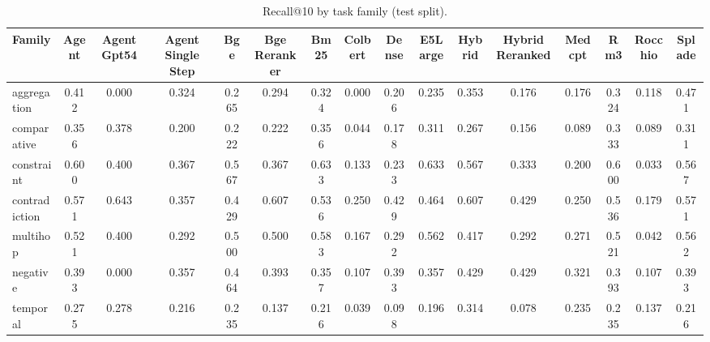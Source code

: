 \begin{table}[t]
\centering
\caption{Recall@10 by task family (test split).}
\label{tab:per_family}
\begin{tabular}{lccccccccccccccc}
\toprule
Family & Agent & Agent Gpt54 & Agent Single Step & Bge & Bge Reranker & Bm25 & Colbert & Dense & E5Large & Hybrid & Hybrid Reranked & Medcpt & Rm3 & Rocchio & Splade \\
\midrule
aggregation & 0.412 & 0.000 & 0.324 & 0.265 & 0.294 & 0.324 & 0.000 & 0.206 & 0.235 & 0.353 & 0.176 & 0.176 & 0.324 & 0.118 & 0.471 \\
comparative & 0.356 & 0.378 & 0.200 & 0.222 & 0.222 & 0.356 & 0.044 & 0.178 & 0.311 & 0.267 & 0.156 & 0.089 & 0.333 & 0.089 & 0.311 \\
constraint & 0.600 & 0.400 & 0.367 & 0.567 & 0.367 & 0.633 & 0.133 & 0.233 & 0.633 & 0.567 & 0.333 & 0.200 & 0.600 & 0.033 & 0.567 \\
contradiction & 0.571 & 0.643 & 0.357 & 0.429 & 0.607 & 0.536 & 0.250 & 0.429 & 0.464 & 0.607 & 0.429 & 0.250 & 0.536 & 0.179 & 0.571 \\
multihop & 0.521 & 0.400 & 0.292 & 0.500 & 0.500 & 0.583 & 0.167 & 0.292 & 0.562 & 0.417 & 0.292 & 0.271 & 0.521 & 0.042 & 0.562 \\
negative & 0.393 & 0.000 & 0.357 & 0.464 & 0.393 & 0.357 & 0.107 & 0.393 & 0.357 & 0.429 & 0.429 & 0.321 & 0.393 & 0.107 & 0.393 \\
temporal & 0.275 & 0.278 & 0.216 & 0.235 & 0.137 & 0.216 & 0.039 & 0.098 & 0.196 & 0.314 & 0.078 & 0.235 & 0.235 & 0.137 & 0.216 \\
\bottomrule
\end{tabular}
\end{table}
